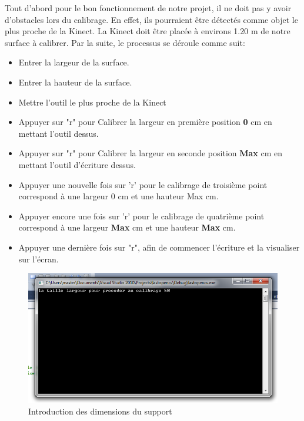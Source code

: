 \documentclass[12pt,a4paper,oneside]{book}
\begin{document}
	Tout d'abord  pour le bon fonctionnement de notre projet, il ne doit pas y avoir d'obstacles lors du calibrage. En effet, ils pourraient être détectés comme objet le plus proche de la Kinect. La Kinect doit être placée à environs 1.20 m de notre surface à calibrer. Par la suite, le processus se déroule comme suit:
	
	\begin{itemize}
		\item Entrer la largeur de la surface.
		\item Entrer la hauteur de la surface.
		
		\item Mettre l'outil le plus proche de la  Kinect 
		\item Appuyer sur "r" pour Calibrer la largeur en première position \textbf{0} cm en mettant l'outil dessus.
		\item Appuyer sur "r" pour Calibrer la largeur en seconde position \textbf{Max} cm en mettant l'outil d'écriture dessus.
		\item Appuyer une nouvelle fois sur 'r' pour le calibrage de troisième point correspond à une largeur 0 cm et une hauteur Max cm.
		\item Appuyer encore une  fois sur 'r' pour le calibrage de quatrième  point correspond à une largeur \textbf{Max } cm et une hauteur \textbf{Max} cm.		
		\item Appuyer une dernière fois sur "r", afin de commencer l'écriture et la visualiser sur l'écran.
	\end{itemize}
	
	\begin{figure}[H]
		
		\centering
		\includegraphics[scale=0.7]{it1.png}
		\caption{Introduction des dimensions du support}
		\label{fig8}
	\end{figure}
	
\end{document}
